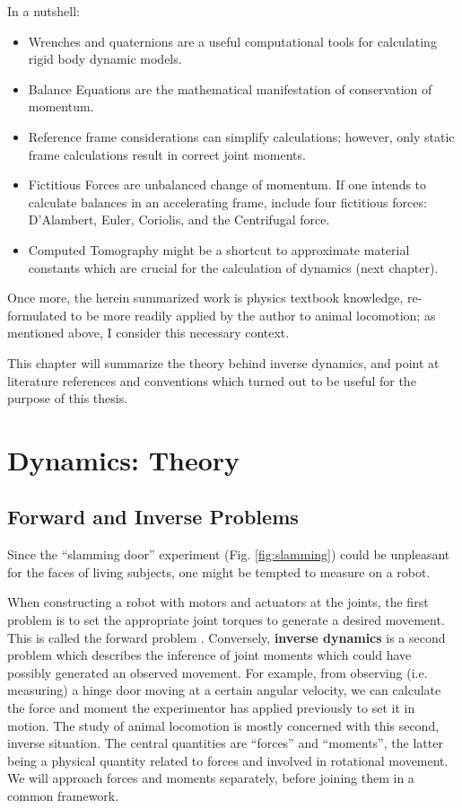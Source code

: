 In a nutshell:
\begin{itemize}
\item Wrenches and quaternions are a useful computational tools for calculating rigid body dynamic models.
\item Balance Equations are the mathematical manifestation of conservation of momentum.
\item Reference frame considerations can simplify calculations; however, only static frame calculations result in correct joint moments.
\item Fictitious Forces are unbalanced change of momentum. If one intends to calculate balances in an accelerating frame, include four fictitious forces: D’Alambert, Euler, Coriolis, and the Centrifugal force.
\item Computed Tomography might be a shortcut to approximate material constants which are crucial for the calculation of dynamics (next chapter).
\end{itemize}


Once more, the herein summarized work is physics textbook knowledge, re-formulated to be more readily applied by the author to animal locomotion; as mentioned above, I consider this necessary context.

This chapter will summarize the theory behind inverse dynamics, and point at literature references and conventions which turned out to be useful for the purpose of this thesis.


\section{Dynamics: Theory}
\label{sec:org6666572}
\subsection{Forward and Inverse Problems}
\label{sec:org50c9c6a}
Since the ``slamming door'' experiment (Fig. \ref{fig:slamming}) could be unpleasant for the faces of living subjects, one might be tempted to measure on a robot.

When constructing a robot with motors and actuators at the joints, the first problem is to set the appropriate joint torques to generate a desired movement.
This is called the forward problem \citep{Lynch2017}.
Conversely, \textbf{inverse dynamics} is a second problem which describes the inference of joint moments which could have possibly generated an observed movement.
For example, from observing (i.e. measuring) a hinge door moving at a certain angular velocity, we can calculate the force and moment the experimentor has applied previously to set it in motion.
The study of animal locomotion is mostly concerned with this second, inverse situation.
The central quantities are ``forces'' and ``moments'', the latter being a physical quantity related to forces and involved in rotational movement.
We will approach forces and moments separately, before joining them in a common framework.


